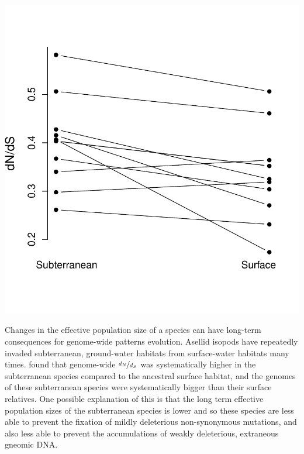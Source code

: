  \begin{marginfigure}
 \begin{center}
 \includegraphics[width=\textwidth]{Journal_figs/drift_selection/asellid_isopods_Nes/asellid_isopods_Nes.pdf}
 \end{center}
 \caption{} \label{fig: asellid_isopods_Nes}
 \end{marginfigure}
Changes in the effective population size of a species can have
long-term consequences for genome-wide patterns evolution. Asellid isopods have repeatedly invaded subterranean, ground-water
habitats from surface-water habitats many times. 
\citet{lefebure2017less} found that genome-wide $\nicefrac{d_N}{d_S}$ was
systematically higher in the subterranean species compared to the
ancestral surface habitat, and the genomes of these subterranean
species were systematically bigger than their surface relatives. One
possible explanation of this is that the long term effective population
sizes of the subterranean species is lower and so these species are less able to
prevent the fixation of mildly deleterious non-synonymous mutations,
and also less able to prevent the accumulations of weakly deleterious, extraneous
gneomic DNA. 


